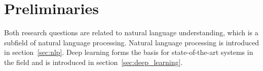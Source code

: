 \clearemptydoublepage

\chapter{Preliminaries}
\label{ch:preliminaries}

Both research questions are related to natural language understanding, which is a subfield of natural language processing.
Natural language processing is introduced in section~\ref{sec:nlp}.
Deep learning forms the basis for state-of-the-art systems in the field and is introduced in section~\ref{sec:deep_learning}.




